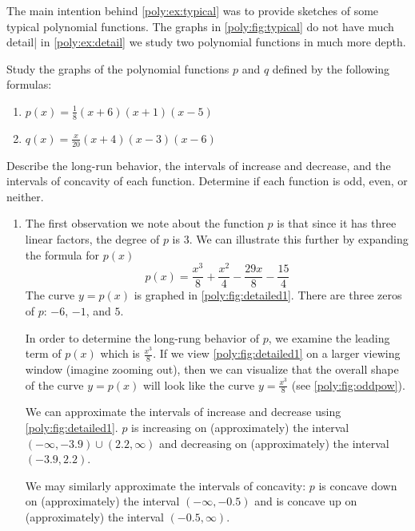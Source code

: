 The main intention behind \cref{poly:ex:typical} was to provide sketches
of some typical polynomial functions. The graphs in \cref{poly:fig:typical}
do not have much detail| in \cref{poly:ex:detail} we study two polynomial
functions in much more depth.

\begin{pccexample}\label{poly:ex:detail}
	Study the graphs of the polynomial functions $p$ and $q$ defined by the following 
	formulas:
	\begin{multicols}{2}
		\begin{enumerate}
			\item $p(x)=\frac{1}{8}(x+6)(x+1)(x-5)$
			\item $q(x)=\frac{x}{20}(x+4)(x-3)(x-6)$
		\end{enumerate}
	\end{multicols}
	Describe the long-run behavior, the intervals of increase and decrease, 
	and the intervals of concavity of each function.
	Determine if each function is odd, even, or neither.
	\begin{pccsolution}
		\begin{enumerate}
			\item The first observation we note about the function $p$ is that 
			since it has three linear factors, the degree of $p$ is $3$. We
			can illustrate this further by expanding the formula for $p(x)$
			\[
				p(x)=\frac{x^3}{8}+\frac{x^2}{4}-\frac{29x}{8}-\frac{15}{4}
			\]  
			The curve $y=p(x)$ is graphed in \cref{poly:fig:detailed1}. There are
			three zeros of $p$: $-6$, $-1$, and $5$. 
				
			In order to determine the long-rung behavior of $p$, we examine the leading
			term of $p(x)$ which is $\frac{x^3}{8}$. If we view \cref{poly:fig:detailed1} 
			on a larger viewing window (imagine zooming out), then we can visualize that the overall
			shape of the curve $y=p(x)$ will look like the curve $y=\frac{x^3}{8}$ (see \cref{poly:fig:oddpow}).
				
			We can approximate the intervals of increase and decrease using 
			\cref{poly:fig:detailed1}. $p$ is increasing on (approximately) the 
			interval $(-\infty,-3.9)\cup (2.2,\infty)$ and decreasing on (approximately)
			the interval $(-3.9,2.2)$.
				
			We may similarly approximate the intervals of concavity: $p$ is concave down
			on (approximately) the interval $(-\infty,-0.5)$ and is concave up on 
			(approximately) the interval $(-0.5,\infty)$.
				

\end{enumerate}
\end{pccsolution}
\end{pccexample}
